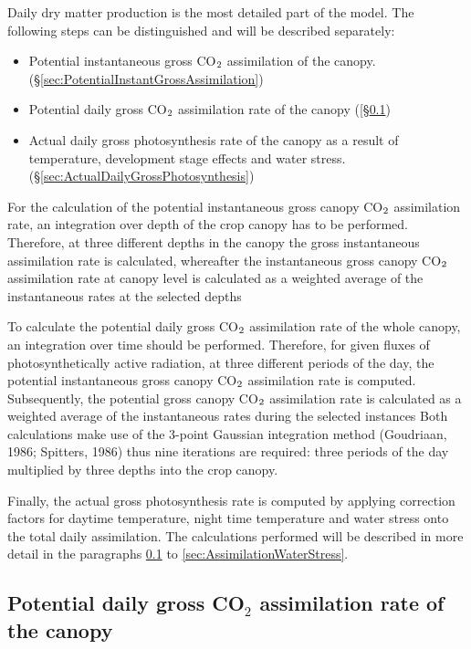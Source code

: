 Daily dry matter production is the most detailed part of the model. The following steps
can be distinguished and will be described separately:
\begin{itemize}
	\item Potential instantaneous gross CO$_{{\rm 2}}$ assimilation of the canopy.
	(\S \ref{sec:PotentialInstantGrossAssimilation})
	\item Potential daily gross CO$_{{\rm 2}}$ assimilation rate of the canopy 
   ([\S \ref{sec:PotentialDailyGrossAssimilation})
	\item Actual daily gross photosynthesis rate of the canopy as a result of temperature,
     development stage effects and water stress.
    (\S \ref{sec:ActualDailyGrossPhotosynthesis})
\end{itemize}

For the calculation of the potential instantaneous gross canopy CO$_{{\rm 2}}$ assimilation rate, an
integration over depth of the crop canopy has to be performed.
Therefore, at three different depths in the canopy the gross instantaneous assimilation rate
is calculated, whereafter the instantaneous gross canopy CO$_{{\rm 2}}$ assimilation rate 
at canopy level is calculated as a weighted average of the instantaneous rates at the selected depths

To calculate the potential daily gross CO$_{{\rm 2}}$ assimilation rate of the whole canopy, 
an integration over time should be performed. Therefore, for given fluxes of photosynthetically
active radiation, at three different periods of the day, the potential instantaneous gross canopy
CO$_{{\rm 2}}$ assimilation rate is computed. Subsequently, the potential gross canopy CO$_{{\rm 2}}$ 
assimilation rate is calculated as a weighted average of the instantaneous rates during the selected instances
Both calculations make use of the 3-point Gaussian integration method (Goudriaan, 1986; Spitters, 1986) 
thus nine iterations are required: three periods of the day multiplied by three depths into the crop canopy. 

Finally, the actual gross photosynthesis rate is 
computed by applying correction factors for daytime temperature,
night time temperature and water stress onto the total daily assimilation. The calculations performed
will be described in more detail in the paragraphs \ref{sec:PotentialDailyGrossAssimilation} to 
\ref{sec:AssimilationWaterStress}.


\subsection{Potential daily gross CO$_{2}$ assimilation rate of the canopy}
\label{sec:PotentialDailyGrossAssimilation}


